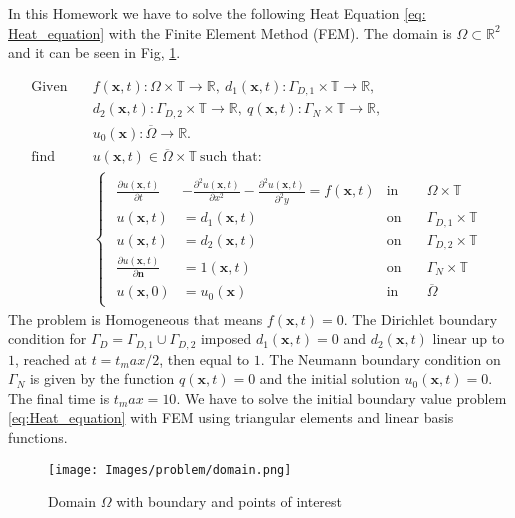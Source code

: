 In this Homework we have to solve the following Heat Equation \eqref{eq: Heat_equation} with the Finite Element Method (FEM). The domain is $\Omega \subset \mathbb{R}^2$ and it can be seen in Fig, \ref{fig: domain}.

\begin{equation}\label{eq:Heat_equation}
\begin{aligned}
    \text{Given} \quad &f(\mathbf{x},t) : \Omega \times \mathbb{T} \longrightarrow \mathbb{R}, \ d_1(\mathbf{x},t):\Gamma_{D,1} \times \mathbb{T} \longrightarrow \mathbb{R},\\
    &d_2(\mathbf{x},t):\Gamma_{D,2} \times \mathbb{T} \longrightarrow \mathbb{R}, \ q(\mathbf{x},t):\Gamma_{N} \times \mathbb{T} \longrightarrow \mathbb{R}, \\
    &u_0(\mathbf{x}): \overline{\Omega} \longrightarrow \mathbb{R}.\\
    \text{find} \quad &u(\mathbf{x},t) \in \overline{\Omega} \times \mathbb{T} \ \text{such that:}\\
    &\begin{cases}
        \begin{aligned}
            \frac{\partial u(\mathbf{x},t)}{\partial t} &- \frac{\partial^2u(\mathbf{x},t)}{\partial x^2}-\frac{\partial^2u(\mathbf{x},t)}{\partial^2y}=f(\mathbf{x},t) & \text{in} \quad &\Omega \times \mathbb{T} \\
            
            u(\mathbf{x},t) &=d_1(\mathbf{x},t) & \text{on} \quad &\Gamma_{D,1} \times \mathbb{T} \\
            
            u(\mathbf{x},t) &=d_2(\mathbf{x},t) & \text{on} \quad &\Gamma_{D,2} \times \mathbb{T} \\
            
            \frac{\partial u(\mathbf{x},t)}{\partial \mathbf{n}} &=1(\mathbf{x},t) & \text{on} \quad &\Gamma_{N} \times \mathbb{T} \\
            
            u(\mathbf{x},0) &= u_0(\mathbf{x}) & \text{in} \quad &\overline{\Omega} 
        \end{aligned}
    \end{cases}
\end{aligned}
\end{equation}
The problem is Homogeneous that means $f(\mathbf{x},t)=0$. The Dirichlet boundary condition for $\Gamma_D=\Gamma_{D,1}\cup \Gamma_{D,2}$ imposed $d_1(\mathbf{x},t)=0$ and $d_2(\mathbf{x},t)$ linear up to $1$, reached at $t=t_max/2$, then equal to $1$. The Neumann boundary condition on $\Gamma_N$ is given by the function $q(\mathbf{x},t)=0$ and the initial solution $u_0(\mathbf{x},t)=0$. The final time is $t_max=10$.
We have to solve the initial boundary value problem \eqref{eq:Heat_equation} with FEM using triangular elements and linear basis functions. 

\begin{figure}[h]
    \centering
    \texttt{[image: Images/problem/domain.png]}
        \caption{Domain $\Omega$ with boundary and points of interest}
        \label{fig: domain}
\end{figure}


